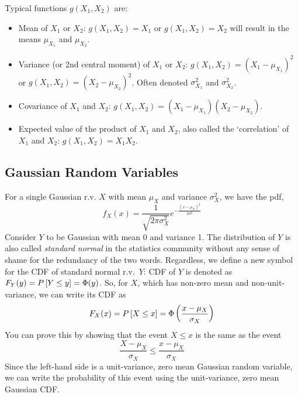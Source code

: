 
Typical functions $g(X_1, X_2)$  are:
\begin{itemize}
  \item Mean of $X_1$ or $X_2$:  $g(X_1, X_2) = X_1$ or $g(X_1, X_2) =
    X_2$ will result in the means $\mu_{X_1}$ and $\mu_{X_2}$.
  \item Variance (or 2nd central moment) of $X_1$ or $X_2$:  $g(X_1, X_2) = (X_1-\mu_{X_1})^2$ or $g(X_1, X_2) =
    (X_2-\mu_{X_2})^2$.  Often denoted $\sigma_{X_1}^2$ and
    $\sigma_{X_2}^2$.
  \item Covariance of $X_1$ and $X_2$: $g(X_1, X_2) =
    (X_1-\mu_{X_1})(X_2-\mu_{X_2})$.
  \item Expected value of the product of $X_1$ and $X_2$, also called the `correlation' of $X_1$ and $X_2$: $g(X_1, X_2) =
    X_1 X_2$.
\end{itemize}


\subsection{Gaussian Random Variables}

For a single Gaussian r.v. $X$ with mean $\mu_X$ and variance
$\sigma_X^2$, we have the pdf,
\[
  f_X(x) = \frac{1}{\sqrt{2\pi \sigma_X^2}} e^{-\frac{(x-\mu_X)^2}{2\sigma^2}}
\]
Consider $Y$ to be Gaussian  with mean 0 and variance 1.  The distribution of $Y$ is also called \emph{standard normal} in the statistics community without any sense of shame for the redundancy of the two words.  Regardless, we define a new symbol for the CDF of standard normal r.v.\ $Y$: 
CDF of $Y$ is denoted as $F_Y(y) = P\left[{Y \le y}\right] = \Phi(y)$.  So, for
$X$, which has non-zero mean and non-unit-variance, we can write its
CDF as
\[
  F_X(x) = P\left[{X\le x}\right] = \Phi \left( \frac{x-\mu_X}{\sigma_X} \right)
\]
You can prove this by showing that the event $X \le x$ is the same
as the event
\[
  \frac{X-\mu_X}{\sigma_X} \le \frac{x-\mu_X}{\sigma_X}
\]
Since the left-hand side is a unit-variance, zero mean Gaussian
random variable, we can write the probability of this event using
the unit-variance, zero mean Gaussian CDF.

